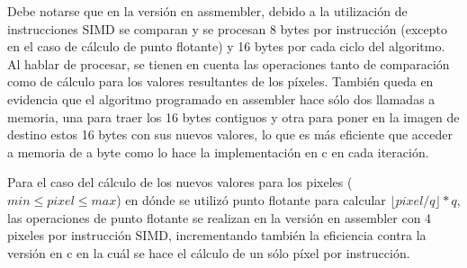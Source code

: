 Debe notarse que en la versión en assmembler, debido a la utilización de instrucciones SIMD se comparan y se procesan 8 bytes por instrucción (excepto en el caso de cálculo de punto flotante) y 16 bytes por cada ciclo del algoritmo. Al hablar de procesar, se tienen en cuenta las operaciones tanto de comparación como de cálculo para los valores resultantes de los píxeles. También queda en evidencia que el algoritmo programado en assembler hace sólo dos llamadas a memoria, una para traer los 16 bytes contiguos y otra para poner en la imagen de destino estos 16 bytes con sus nuevos valores, lo que es más eficiente que acceder a memoria de a byte como lo hace la implementación en c en cada iteración.

Para el caso del cálculo de los nuevos valores para los pixeles ($min \leq pixel \leq max$) en dónde se utilizó punto flotante para calcular $\lfloor pixel/q \rfloor * q$, las operaciones de punto flotante se realizan en la versión en assembler con 4 pixeles por instrucción SIMD, incrementando también la eficiencia contra la versión en c en la cuál se hace el cálculo de un sólo píxel por instrucción.
